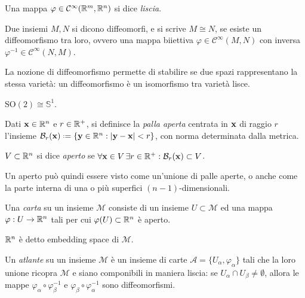 \begin{definition}
	Una mappa $ \varphi \in \mathcal{C}^{\infty}(\mathbb{R}^m,\mathbb{R}^n) $ si dice \textit{liscia}.
\end{definition}

\begin{definition}
	Due insiemi $ M,N $ si dicono diffeomorfi, e si scrive $ M \cong N $, se esiste un diffeomorfismo tra loro, ovvero una mappa biiettiva $ \varphi \in \mathcal{C}^{\infty}(M,N) $ con inversa $ \varphi^{-1} \in \mathcal{C}^{\infty}(N,M) $.
\end{definition}

La nozione di diffeomorfismo permette di stabilire se due spazi rappresentano la stessa varietà: un diffeomorfismo è un isomorfismo tra varietà lisce.

\begin{example}
	$ \text{SO}(2) \cong \mathbb{S}^1 $.
\end{example}

\begin{definition}
	Dati $ \mathbf{x} \in \mathbb{R}^n $ e $ r \in \mathbb{R}^+ $, si definisce la \textit{palla aperta} centrata in $ \mathbf{x} $ di raggio $ r $ l'insieme $ \mathcal{B}_r(\ve{x}) \defeq \{ \ve{y} \in \R^n : \abs{\ve{y} - \ve{x}} < r \} $, con norma determinata dalla metrica.
\end{definition}

\begin{definition}
	$ V \subset \mathbb{R}^n $ si dice \textit{aperto} se $ \forall \mathbf{x} \in V \, \exists r \in \mathbb{R}^+ : \mathcal{B}_r(\mathbf{x}) \subset V $.
\end{definition}

Un aperto può quindi essere visto come un'unione di palle aperte, o anche come la parte interna di una o più superfici $ (n-1) $-dimensionali.

\begin{definition}
	Una \textit{carta} su un insieme $ \mathcal{M} $ consiste di un insieme $ U \subset \mathcal{M} $ ed una mappa $ \varphi : U \rightarrow \mathbb{R}^n $ tali per cui $ \varphi(U) \subset \mathbb{R}^n $ è aperto.
\end{definition}

$ \mathbb{R}^n $ è detto embedding space di $ \mathcal{M} $.

\begin{definition}
	Un \textit{atlante} su un insieme $ \mathcal{M} $ è un insieme di carte $ \mathcal{A} = \{U_{\alpha},\varphi_{\alpha}\} $ tali che la loro unione ricopra $ \mathcal{M} $ e siano componibili in maniera liscia: se $ U_{\alpha} \cap U_{\beta} \neq \emptyset $, allora le mappe $ \varphi_{\alpha} \circ \varphi_{\beta}^{-1} $ e $ \varphi_{\beta} \circ \varphi_{\alpha}^{-1} $ sono diffeomorfismi.
\end{definition}

